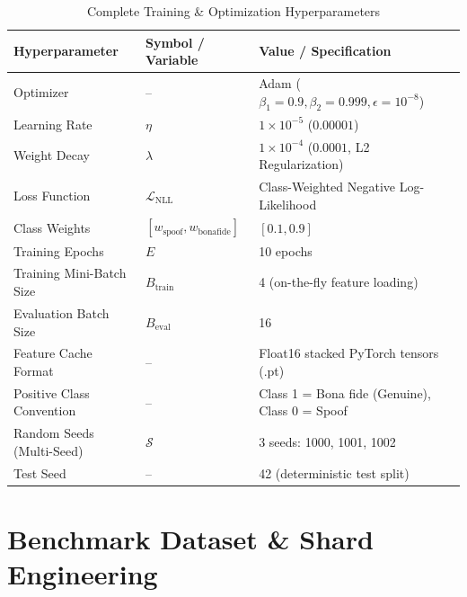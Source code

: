 \documentclass[11pt,a4paper]{article}
\begin{document}
\begin{table}[h!]
\centering
\small
\caption{Complete Training \& Optimization Hyperparameters}
\label{tab:hyperparams}
\begin{tabular}{lll}
\toprule
\textbf{Hyperparameter} & \textbf{Symbol / Variable} & \textbf{Value / Specification} \\
\midrule
Optimizer & -- & Adam ($\beta_1 = 0.9, \beta_2 = 0.999, \epsilon = 10^{-8}$) \\
Learning Rate & $\eta$ & $1 \times 10^{-5}$ ($0.00001$) \\
Weight Decay & $\lambda$ & $1 \times 10^{-4}$ ($0.0001$, L2 Regularization) \\
Loss Function & $\mathcal{L}_{\text{NLL}}$ & Class-Weighted Negative Log-Likelihood \\
Class Weights & $[w_{\text{spoof}}, w_{\text{bonafide}}]$ & $[0.1, 0.9]$ \\
Training Epochs & $E$ & 10 epochs \\
Training Mini-Batch Size & $B_{\text{train}}$ & 4 (on-the-fly feature loading) \\
Evaluation Batch Size & $B_{\text{eval}}$ & 16 \\
Feature Cache Format & -- & Float16 stacked PyTorch tensors (.pt) \\
Positive Class Convention & -- & Class 1 = Bona fide (Genuine), Class 0 = Spoof \\
Random Seeds (Multi-Seed) & $\mathcal{S}$ & 3 seeds: 1000, 1001, 1002 \\
Test Seed & -- & 42 (deterministic test split) \\
\bottomrule
\end{tabular}
\end{table}

\section{Benchmark Dataset \& Shard Engineering}
\end{document}
